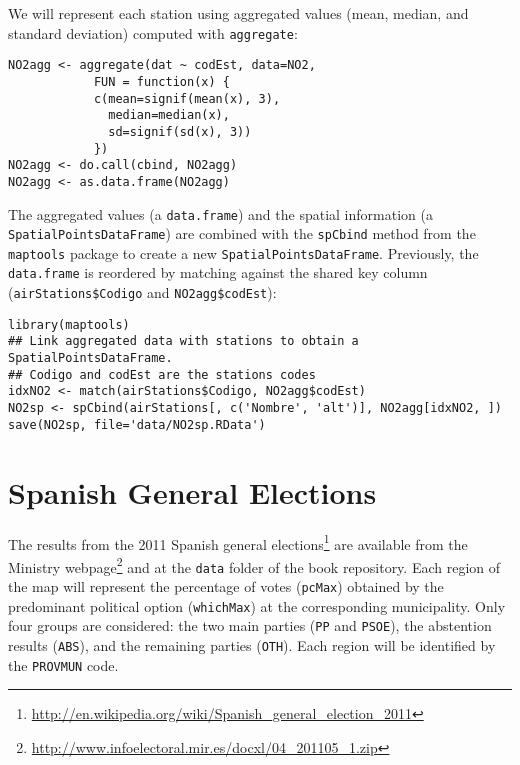 We will represent each station using aggregated values (mean, median,
and standard deviation) computed with \texttt{aggregate}:


\lstset{language=R,numbers=none}
\begin{lstlisting}
NO2agg <- aggregate(dat ~ codEst, data=NO2,
		    FUN = function(x) {
			c(mean=signif(mean(x), 3),
			  median=median(x),
			  sd=signif(sd(x), 3))
			})
NO2agg <- do.call(cbind, NO2agg)
NO2agg <- as.data.frame(NO2agg)
\end{lstlisting}

The aggregated values (a \texttt{data.frame}) and the spatial information (a
\texttt{SpatialPointsDataFrame}) are combined with the \texttt{spCbind} method from
the \texttt{maptools} package to create a new
\texttt{SpatialPointsDataFrame}. Previously, the \texttt{data.frame} is reordered by
matching against the shared key column (\texttt{airStations\$Codigo} and
\texttt{NO2agg\$codEst}):

 

\lstset{language=R,numbers=none}
\begin{lstlisting}
library(maptools)
## Link aggregated data with stations to obtain a SpatialPointsDataFrame.
## Codigo and codEst are the stations codes
idxNO2 <- match(airStations$Codigo, NO2agg$codEst)
NO2sp <- spCbind(airStations[, c('Nombre', 'alt')], NO2agg[idxNO2, ])
save(NO2sp, file='data/NO2sp.RData')
\end{lstlisting}

\section{Spanish General Elections}
\label{sec-2}
The results from the 2011 Spanish general elections\footnote{\url{http://en.wikipedia.org/wiki/Spanish_general_election_2011}} are
available from the Ministry webpage\footnote{\url{http://www.infoelectoral.mir.es/docxl/04_201105_1.zip}} and at the \texttt{data} folder of
the book repository. Each region of the map will represent the
percentage of votes (\texttt{pcMax}) obtained by the predominant political
option (\texttt{whichMax}) at the corresponding municipality.  Only four
groups are considered: the two main parties (\texttt{PP} and \texttt{PSOE}), the
abstention results (\texttt{ABS}), and the remaining parties (\texttt{OTH}). Each
region will be identified by the \texttt{PROVMUN} code.

